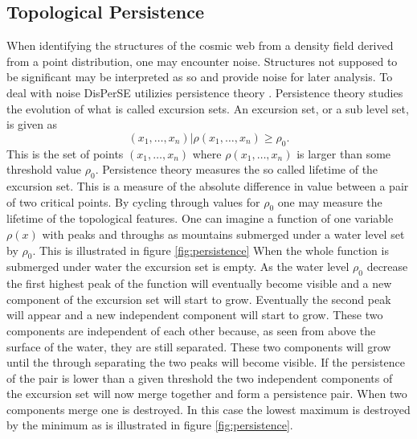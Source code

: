 \subsection{Topological Persistence}\label{sec:persistence}
When identifying the structures of the cosmic web from a density field derived
from a point distribution, one may
encounter noise. Structures not supposed to be significant may be interpreted as
so and provide noise for later analysis. To deal with noise DisPerSE utilizies
persistence theory \cite{persistence}. Persistence theory studies the evolution
of what is called excursion sets. An excursion set, or a sub level set, is given as
\begin{equation}
    (x_1,\dots, x_n)\vert\rho(x_1,\dots, x_n)\geq\rho_0.
\end{equation}
This is the set of points $(x_1,\dots, x_n)$ where $\rho(x_1,\dots, x_n)$ is
larger than some threshold value $\rho_0$. Persistence theory measures the so
called lifetime of the excursion set. This is a measure of the absolute
difference in value between a pair of two critical points. By cycling through
values for $\rho_0$ one may measure the lifetime of the topological features.
One can imagine a function of one variable $\rho(x)$ with peaks and throughs as
mountains submerged under a water level set by $\rho_0$. This is illustrated in
figure \ref{fig:persistence}
When the whole function is submerged under water the excursion set is empty. As
the water level $\rho_0$ decrease the first highest peak of the function will
eventually become visible and a new component of the excursion set will start to
grow. Eventually the second peak will appear and a new independent component
will start to grow. These two components are independent of each other because,
as seen from above the surface of the water, they are still separated. These two
components will grow until the through separating the two peaks will become
visible. If the persistence of the pair is lower than a given threshold the two independent components of the excursion set will now merge
together and form a persistence pair. When two components merge one is
destroyed. In this case the lowest maximum is destroyed by the minimum as is
illustrated in figure \ref{fig:persistence}.\\

